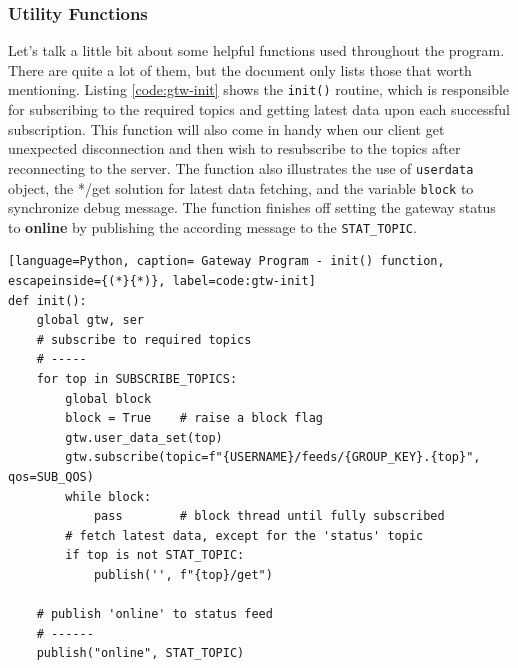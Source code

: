 \subsubsection{Utility Functions}
Let's talk a little bit about some helpful functions used throughout the program. There are quite a lot of them, but the document only lists those that worth mentioning. Listing \ref{code:gtw-init} shows the \texttt{init()} routine, which is responsible for subscribing to the required topics and getting latest data upon each successful subscription. This function will also come in handy when our client get unexpected disconnection and then wish to resubscribe to the topics after reconnecting to the server. The function also illustrates the use of \texttt{userdata} object, the */get solution for latest data fetching, and the variable \texttt{block} to synchronize debug message. The function finishes off setting the gateway status to \textbf{online} by publishing the according message to the \texttt{STAT\_TOPIC}.
\begin{lstlisting}[language=Python, caption= Gateway Program - init() function, escapeinside={(*}{*)}, label=code:gtw-init]
def init():
    global gtw, ser
    # subscribe to required topics
    # -----
    for top in SUBSCRIBE_TOPICS:
        global block
        block = True    # raise a block flag
        gtw.user_data_set(top)
        gtw.subscribe(topic=f"{USERNAME}/feeds/{GROUP_KEY}.{top}", qos=SUB_QOS)
        while block:
            pass        # block thread until fully subscribed
        # fetch latest data, except for the 'status' topic
        if top is not STAT_TOPIC:
            publish('', f"{top}/get")

    # publish 'online' to status feed
    # ------
    publish("online", STAT_TOPIC)
\end{lstlisting}

